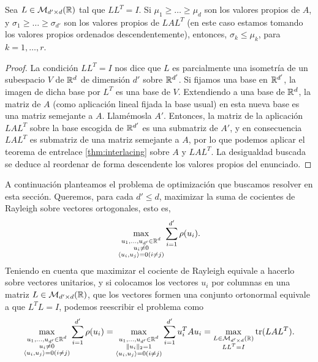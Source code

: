 \begin{cor} \label{cor: interlace}
    Sea $L \in \mathcal{M}_{d' \times d}(\mathbb{R})$ tal que $LL^T = I$. Si $\mu_1 \ge \dots \ge \mu_d$ son los valores propios de $A$, y $\sigma_1 \ge \dots \ge \sigma_{d'}$ son los valores propios de $LAL^T$ (en este caso estamos tomando los valores propios ordenados descendentemente), entonces, $\sigma_k \le \mu_k$, para $k = 1,\dots,r$.
\end{cor}

\begin{proof}
    La condición $LL^T = I$ nos dice que $L$ es parcialmente una isometría de un subespacio $V$ de $\mathbb{R}^d$ de dimensión $d'$  sobre $\mathbb{R}^{d'}$. Si fijamos una base en $\mathbb{R}^{d'}$, la imagen de dicha base por $L^T$ es una base de $V$. Extendiendo a una base de $\mathbb{R}^d$, la matriz de $A$ (como aplicación lineal fijada la base usual) en esta nueva base es una matriz semejante a $A$. Llamémosla $A'$. Entonces, la matriz de la aplicación $LAL^T$ sobre la base escogida de $\mathbb{R}^{d'}$ es una submatriz de $A'$, y en consecuencia $LAL^T$ es submatriz de una matriz semejante a $A$, por lo que podemos aplicar el teorema de entrelace \ref{thm:interlacing} sobre $A$ y $LAL^T$. La desigualdad buscada se deduce al reordenar de forma descendente los valores propios del enunciado.
\end{proof}

A continuación planteamos el problema de optimización que buscamos resolver en esta sección. Queremos, para cada $d' \le d$, maximizar la suma de cocientes de Rayleigh sobre vectores ortogonales, esto es,
\begin{equation}
    \max_{\substack{u_1,\dots,u_{d'} \in  \mathbb{R}^d \\ u_i \ne 0 \\ \langle u_i, u_j \rangle = 0 (i \ne j)}} \sum_{i=1}^{d'} \rho(u_i).
\end{equation}
Teniendo en cuenta que maximizar el cociente de Rayleigh equivale a hacerlo sobre vectores unitarios, y si colocamos los vectores $u_i$ por columnas en una matriz $L \in \mathcal{M}_{d'\times d}(\mathbb{R})$, que los vectores formen una conjunto ortonormal equivale a que $L^TL = I$, podemos reescribir el problema como
\begin{equation}
    \max_{\substack{u_1,\dots,u_{d'} \in  \mathbb{R}^d \\ u_i \ne 0 \\ \langle u_i, u_j \rangle = 0 (i \ne j)}} \sum_{i=1}^{d'} \rho(u_i) = \max_{\substack{u_1,\dots,u_{d'} \in  \mathbb{R}^d \\ \|u_i\|_2 = 1 \\ \langle u_i, u_j \rangle = 0 (i \ne j)}} \sum_{i=1}^{d'} u_i^TAu_i = \max_{\substack{L \in \mathcal{M}_{d'\times d}(\mathbb{R}) \\ LL^T  = I}} \operatorname{tr}(LAL^T). 
\end{equation}

